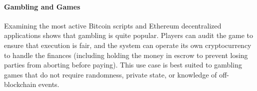 \paragraph{Gambling and Games}

Examining the most active Bitcoin scripts and Ethereum decentralized applications shows that gambling is quite popular. Players can audit the game to ensure that execution is fair, and the system can operate its own cryptocurrency to handle the finances (including holding the money in escrow to prevent losing parties from aborting before paying). This use case is best suited to gambling games that do not require randomness, private state, or knowledge of off-blockchain events.




